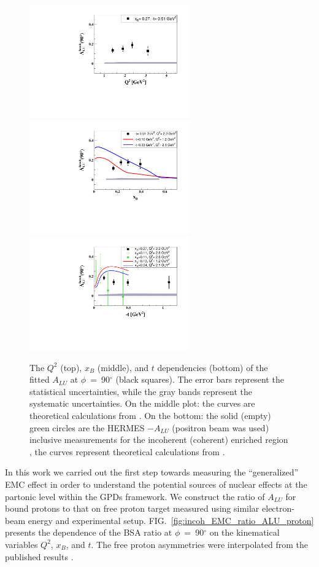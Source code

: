 \documentclass[twocolumn,nofootinbib,showpacs,prl,superscriptaddress,secnumarabic,amssymb,nobibnotes,aps,floatfix]{revtex4}
\begin{document}
\begin{figure}[tb]
\includegraphics[width=6.9cm]{figs/ALU_90_p_vs_Q2_shortscenrario.pdf}
\includegraphics[width=6.9cm]{figs/ALU_90_p_vs_x_shortscenrario.pdf}
\includegraphics[width=6.9cm]{figs/ALU_90_p_vs_t_shortscenrario.pdf}
\caption{The $Q^{2}$ (top), $x_{B}$ (middle), and $t$ dependencies (bottom) of
   the fitted $A_{LU}$ at $\phi$~=~90$^{\circ}$ (black squares). The error bars 
   represent the statistical uncertainties, while the gray bands represent the 
   systematic uncertainties. On the middle plot: the curves are theoretical 
   calculations from \cite{simonetta_2}. On the bottom: the solid (empty) green 
   circles are the HERMES $-A_{LU}$ (positron beam was used) inclusive 
measurements for the incoherent (coherent) enriched region 
\cite{Airapetian:2009cga}, the curves represent theoretical calculations from 
\cite{simonetta_2}.  } \label{fig:alu90}
\end{figure}

In this work we carried out the first step towards measuring the 
``generalized'' EMC effect in order to understand the potential sources of 
nuclear effects at the partonic level within the GPDs framework. We construct 
the ratio of $A_{LU}$ for bound protons to that on free proton target measured 
using similar electron-beam energy and experimental setup.  
FIG.~\ref{fig:incoh_EMC_ratio_ALU_proton} presents the dependence of the 
BSA ratio at $\phi$~=~90$^{\circ}$ on the kinematical variables 
$Q^2$, $x_B$, and $t$. The free proton asymmetries were interpolated from the 
published results \cite{Girod:2007aa}.   
\end{document}
